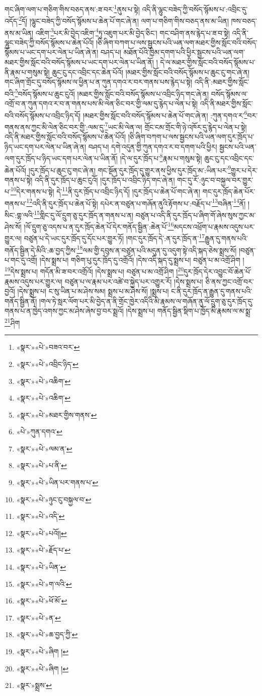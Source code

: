 གང་ཞིག་ལག་པ་གཅིག་གིས་བཅད་ནས་:ཟ་བར་\footnote{«སྣར་»«པེ་»བཟའ་བར་}ནུས་པ་སྟེ། འདི་ནི་ལྷུང་བཟེད་ཀྱི་བསོད་སྙོམས་པ་:འབྲིང་དུ་འདོད་\footnote{«སྣར་»«པེ་»འབྲིང་ཉིད་}དོ། །ལྷུང་བཟེད་ཀྱི་བསོད་སྙོམས་པ་ཆེན་པོ་གང་ཞེ་ན། ལག་པ་གཅིག་གིས་བཅད་ནས་མ་ཡིན། ཁས་བཅད་ནས་མ་ཡིན། འཇིག་\footnote{«སྣར་»«པེ་»འཆིག་}པར་མི་བྱེད་འཇིག་\footnote{«སྣར་»«པེ་»འཆིག་}ཏུ་འཇུག་པར་མི་བྱེད་ཅིང་། གང་བཤིག་ནས་རྙེད་པ་ཟ་བ་སྟེ། འདི་ནི་ལྷུང་བཟེད་ཀྱི་བསོད་སྙོམས་པ་ཆེན་པོའོ། །ཅི་ཞིག་བཀག་པ་ལས་སྦྱངས་པའི་ཡན་ལག་མཐར་གྱིས་སློང་བའི་བསོད་སྙོམས་པ་ཡང་དག་པར་ལེན་པ་ཡིན་ཞེ་ན། བཤད་པ། མཐོན་པོའི་ཁྱིམ་དགག་པའི་ཕྱིར་སྦྱངས་པའི་ཡན་ལག་མཐར་གྱིས་སློང་བའི་བསོད་སྙོམས་པ་ཡང་དག་པར་ལེན་པ་ཡིན་ནོ། །
དེ་ལ་མཐར་གྱིས་སློང་བའི་བསོད་སྙོམས་པ་ནི་རྣམ་པ་གསུམ་སྟེ། ཆུང་ངུ་དང་འབྲིང་དང་ཆེན་པོའོ། །མཐར་གྱིས་སློང་བའི་བསོད་སྙོམས་པ་ཆུང་ངུ་གང་ཞེ་ན། གང་ཞིག་གྲོང་དུ་བསོད་སྙོམས་ལ་ཕྱིན་པ་ན་ཀུན་དགའ་ར་བར་གནས་པས་རྙེད་པ་སྟེ། འདི་ནི་:མཐར་གྱིས་སློང་བའི་\footnote{«སྣར་»«པེ་»མཐར་གྱིས་གནས་}བསོད་སྙོམས་པ་ཆུང་ངུའོ། །མཐར་གྱིས་སློང་བའི་བསོད་སྙོམས་པ་འབྲིང་ཉིད་གང་ཞེ་ན། བསོད་སྙོམས་ལ་འགྲོ་བ་ན་ཀུན་དགའ་ར་བ་ན་གནས་པས་མི་ལེན་ཅིང་བར་གྱི་ལམ་དུ་རྙེད་པ་ལེན་པ་སྟེ། འདི་ནི་མཐར་གྱིས་སློང་བའི་བསོད་སྙོམས་པ་འབྲིང་ཉིད་དོ། །མཐར་གྱིས་སློང་བའི་བསོད་སྙོམས་པ་ཆེན་པོ་གང་ཞེ་ན། :ཀུན་དགའ་ར་\footnote{«པེ་»ཀུན་དགའ་}བར་གནས་ནས་ཀྱང་མི་ལེན་ཅིང་བར་གྱི་:ལམ་དུ་\footnote{«སྣར་»«པེ་»ལམ་ན་}ཡང་མི་ལེན་ལ། གྲོང་ངམ་གྲོང་གི་ཉེ་འཁོར་དུ་རྙེད་པ་ལེན་པ་སྟེ། འདི་ནི་མཐར་གྱིས་སློང་བའི་བསོད་སྙོམས་པ་ཆེན་པོའོ། །ཅི་ཞིག་བཀག་པ་ལས་སྦྱངས་པའི་ཡན་ལག་དུར་ཁྲོད་པ་ཉིད་ཡང་དག་པར་ལེན་པ་ཡིན་ཞེ་ན། བཤད་པ། དགེ་འདུན་གྱི་ཀུན་དགའ་ར་བ་དགག་པའི་ཕྱིར། སྦྱངས་པའི་ཡན་ལག་དུར་ཁྲོད་པ་ཉིད་ཡང་དག་པར་ལེན་པ་ཡིན་ནོ། །དེ་ལ་དུར་ཁྲོད་པ་\footnote{«སྣར་»«པེ་»པ་ནི་}རྣམ་པ་གསུམ་སྟེ། ཆུང་ངུ་དང་འབྲིང་དང་ཆེན་པོའོ། །དུར་ཁྲོད་པ་ཆུང་ངུ་གང་ཞེ་ན། གང་སྔོན་དུར་ཁྲོད་དུ་གྱུར་ནས་ཕྱིས་དུར་ཁྲོད་མ་:ཡིན་པར་\footnote{«སྣར་»«པེ་»ཡིན་པར་གནས་པ་}གྱུར་པ་དེར་གནས་པ་སྟེ། འདི་ནི་དུར་ཁྲོད་པ་ཆུང་ངུའོ། །དུར་ཁྲོད་པ་འབྲིང་ཉིད་གང་ཞེ་ན། གང་དུ་རོ་:ཉུང་བ་བསྐྱལ་བར་གྱུར་པ་\footnote{«སྣར་»«པེ་»ཉུང་ངུ་བསྐྱལ་བ་}དེར་གནས་པ་སྟེ། དེ་\footnote{«སྣར་»«པེ་»འདི་}ནི་དུར་ཁྲོད་པ་འབྲིང་ཉིད་དོ། །དུར་ཁྲོད་པ་ཆེན་པོ་གང་ཞེ་ན། གང་དུར་ཁྲོད་ཆེན་པོར་གནས་པ་\footnote{«སྣར་»«པེ་»པའོ།།}འདི་ནི་དུར་ཁྲོད་པ་ཆེན་པོ་སྟེ། དཔེར་ན་བཙུན་པ་གཞོན་ནུའི་རྟོགས་པ་:བརྗོད་པ་\footnote{«སྣར་»«པེ་»རྗོད་པ་}བཞིན་\footnote{«སྣར་»«པེ་»ཡིན་}ནོ། །སིང་:གྷ་ལའི་\footnote{«སྣར་»«པེ་»ག་ལའི་}གླིང་དུ་ལོ་དྲུག་ཅུ་དུར་ཁྲོད་ན་གནས་པ་ན། བཙུན་པ་འདི་ནི་དུར་ཁྲོད་པ་ཞིག་གོ་ཞེས་སུས་ཀྱང་མ་ཤེས་སོ། །ལོ་དྲུག་ཅུ་འདས་པ་ན་དུར་ཁྲོད་ཆེན་པོ་དེར་གནོད་སྦྱིན་:ཆེན་པོ་\footnote{«སྣར་»«པེ་»ཕོ་མོ་}མདངས་འཕྲོག་པ་རྣམས་འདུས་པར་གྱུར་ལ། བཙུན་པ་དེ་ཡང་དུར་ཁྲོད་དུ་དོང་པར་གྱུར་ཏོ། །གང་དུར་ཁྲོད་དེ་:ན་དུར་ཁྲོད་ན་\footnote{«སྣར་»«པེ་»ན་}རྒྱུན་དུ་གནས་པའི་གནོད་སྦྱིན་དེ་མིའི་:ཆ་བྱད་ཀྱིས་\footnote{«སྣར་»«པེ་»ཆ་བྱད་ཀྱི་}ལམ་གྱི་དབུས་ན་བཙུན་པའི་མདུན་དུ་འདུག་སྟེ་འདི་སྐད་ཅེས་སྨྲས་སོ། །བཙུན་པ་གང་དུ་འགྲོ། །དེས་སྨྲས་པ། གཅིག་པུ་དུར་ཁྲོད་དུ་འགྲོའོ། །དེས་འདི་སྐད་དུ་སྨྲས་པ། བཙུན་པ་མ་འགྲོ་ཤིག །\footnote{«སྣར་»«པེ་»ཞིག །}དེས་སྨྲས་པ། གདོན་མི་ཟ་བར་འགྲོའོ། །དེས་སྨྲས་པ། བཙུན་པ་མ་འགྲོ་ཤིག །\footnote{«སྣར་»«པེ་»ཞིག །}དུར་ཁྲོད་དེར་འབྱུང་བོ་ཆེན་པོ་རྣམས་འདུས་པར་གྱུར་ལ། བཙུན་པ་ལ་རྣམ་པར་འཚེ་བ་སྐྱེད་པར་འགྱུར་རོ། །དེས་སྨྲས་པ། ཅི་ནས་ཀྱང་འགྲོ་བར་བྱའོ། །དེས་སྨྲས་པ། ང་སུ་ཡིན་པ་མ་ཤེས་སམ། སྨྲས་པ་མ་ཤེས་སོ། །སྨྲས་པ། ང་ནི་དུར་ཁྲོད་ན་རྒྱུན་དུ་གནས་པའི་གནོད་སྦྱིན་ནོ། །གལ་ཏེ་སླར་ལོག་པར་མི་བྱེད་ན་ནི་གྲོང་ཁྱེར་འདིའི་མི་རྣམས་ལ་གཞོན་ནུ་ལོ་དྲུག་ཅུ་དུར་ཁྲོད་དུ་གནས་པ་ན་ཁྱེད་འགས་ཀྱང་མ་ཤེས་ཞེས་བྱ་བར་སྨྲའོ། །དེས་སྨྲས་པ། གནོད་སྦྱིན་སྡིག་པ་ཁྱོད་མི་རྣམས་ལ་མ་སྨྲ་\footnote{«སྣར་»སྨྲས་}ཤིག 